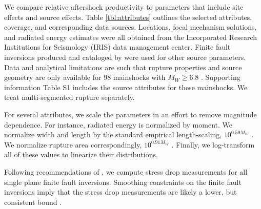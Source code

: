 \documentclass[draft, jgrga]{agujournal2018}
\begin{document}

We compare relative aftershock productivity to parameters that include site effects and source effects. Table \ref{tbl:attributes} outlines the selected attributes, coverage, and corresponding data sources. Locations, focal mechanism solutions, and radiated energy estimates were all obtained from the Incorporated Research Institutions for Seismology (IRIS) data management center. Finite fault inversions produced and cataloged by \citet{Hayes2017} were used for other source parameters. Data and analytical limitations are such that rupture properties and source geometry are only available for 98 mainshocks with $M_W\ge6.8$ \citep{Hayes2017}. Supporting information Table S1 includes the source attributes for these mainshocks. We treat multi-segmented rupture separately.

For several attributes, we scale the parameters in an effort to remove magnitude dependence. For instance, radiated energy is normalized by moment. We normalize width and length by the standard empirical length-scaling, $10^{0.59M_W}$ \citep[][Table 2A - Subsurface rupture dimensions]{Wells1994}. We normalize rupture area correspondingly, $10^{0.91M_W}$ \citep[][Table 2A - Rupture area]{Wells1994}. Finally, we log-transform all of these values to linearize their distributions.

Following recommendations of \citet{Noda2013}, we compute stress drop measurements for all single plane finite fault inversions. Smoothing constraints on the finite fault inversions imply that the stress drop measurements are likely a lower, but consistent bound \citep{Adams2017ExploringInversions}.
\end{document}
